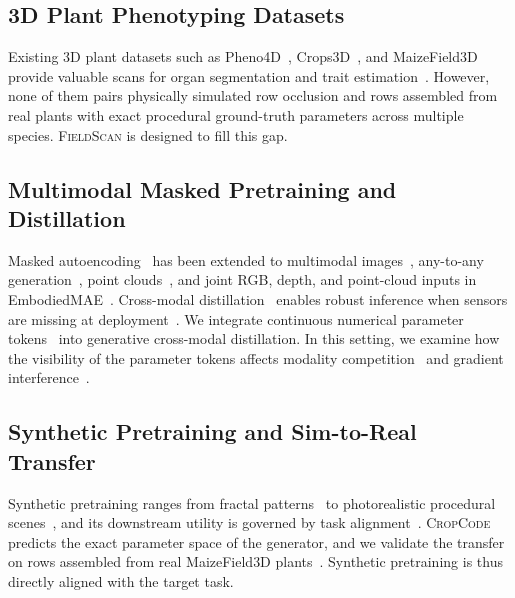 \documentclass[10pt,twocolumn,letterpaper]{article}
\newcommand{\method}{\textsc{CropCode}}
\newcommand{\dataset}{\textsc{FieldScan}}
\begin{document}
\subsection{3D Plant Phenotyping Datasets}
Existing 3D plant datasets such as Pheno4D~\citep{schunck2021pheno4d}, Crops3D~\citep{crops3d2024}, and MaizeField3D~\citep{maizefield3d2025} provide valuable scans for organ segmentation and trait estimation~\citep{qi2017pointnet,qi2017pointnetpp,arshad2024nerf_field}. However, none of them pairs physically simulated row occlusion and rows assembled from real plants with exact procedural ground-truth parameters across multiple species. \dataset{} is designed to fill this gap.

\subsection{Multimodal Masked Pretraining and Distillation}
Masked autoencoding~\citep{he2022mae} has been extended to multimodal images~\citep{bachmann2022multimae}, any-to-any generation~\citep{mizrahi2023fourm,bachmann2024fourm21}, point clouds~\citep{pang2022pointmae}, and joint RGB, depth, and point-cloud inputs in EmbodiedMAE~\citep{dong2025embodiedmae}. Cross-modal distillation~\citep{hinton2015distillation} enables robust inference when sensors are missing at deployment~\citep{wang2024robustmissing}. We integrate continuous numerical parameter tokens~\citep{golkar2023xval} into generative cross-modal distillation. In this setting, we examine how the visibility of the parameter tokens affects modality competition~\citep{peng2022ogm} and gradient interference~\citep{yu2020pcgrad,chen2018gradnorm}.

\subsection{Synthetic Pretraining and Sim-to-Real Transfer}
Synthetic pretraining ranges from fractal patterns~\citep{kataoka2020fractaldb} to photorealistic procedural scenes~\citep{raistrick2023infinigen,greff2022kubric,tobin2017domainrand}, and its downstream utility is governed by task alignment~\citep{fan2023intriguing,alemohammad2023mad}. \method{} predicts the exact parameter space of the generator, and we validate the transfer on rows assembled from real MaizeField3D plants~\citep{maizefield3d2025}. Synthetic pretraining is thus directly aligned with the target task.
\end{document}
